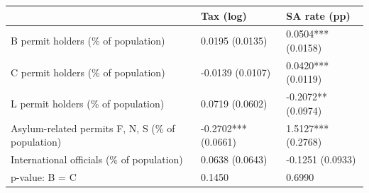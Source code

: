 \begin{tabular}{lll}
\toprule
 & Tax (log) & SA rate (pp) \\
\midrule
B permit holders (\% of population) & 0.0195 (0.0135) & 0.0504*** (0.0158) \\
C permit holders (\% of population) & -0.0139 (0.0107) & 0.0420*** (0.0119) \\
L permit holders (\% of population) & 0.0719 (0.0602) & -0.2072** (0.0974) \\
Asylum-related permits F, N, S (\% of population) & -0.2702*** (0.0661) & 1.5127*** (0.2768) \\
International officials (\% of population) & 0.0638 (0.0643) & -0.1251 (0.0933) \\
p-value: B = C & 0.1450 & 0.6990 \\
\bottomrule
\end{tabular}
